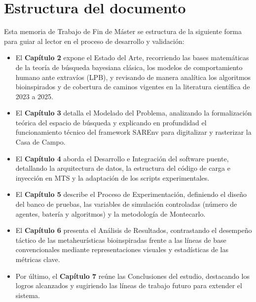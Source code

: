 \section{Estructura del documento}
Esta memoria de Trabajo de Fin de Máster se estructura de la siguiente forma para guiar al lector en el proceso de desarrollo y validación:
\begin{itemize}
    \item El \textbf{Capítulo 2} expone el Estado del Arte, recorriendo las bases matemáticas de la teoría de búsqueda bayesiana clásica, los modelos de comportamiento humano ante extravíos (LPB), y revisando de manera analítica los algoritmos bioinspirados y de cobertura de caminos vigentes en la literatura científica de 2023 a 2025.
    \item El \textbf{Capítulo 3} detalla el Modelado del Problema, analizando la formalización teórica del espacio de búsqueda y explicando en profundidad el funcionamiento técnico del framework SAREnv para digitalizar y rasterizar la Casa de Campo.
    \item El \textbf{Capítulo 4} aborda el Desarrollo e Integración del software puente, detallando la arquitectura de datos, la estructura del código de carga e inyección en MTS y la adaptación de los scripts experimentales.
    \item El \textbf{Capítulo 5} describe el Proceso de Experimentación, definiendo el diseño del banco de pruebas, las variables de simulación controladas (número de agentes, batería y algoritmos) y la metodología de Montecarlo.
    \item El \textbf{Capítulo 6} presenta el Análisis de Resultados, contrastando el desempeño táctico de las metaheurísticas bioinspiradas frente a las líneas de base convencionales mediante representaciones visuales y estadísticas de las métricas clave.
    \item Por último, el \textbf{Capítulo 7} reúne las Conclusiones del estudio, destacando los logros alcanzados y sugiriendo las líneas de trabajo futuro para extender el sistema.
\end{itemize}
